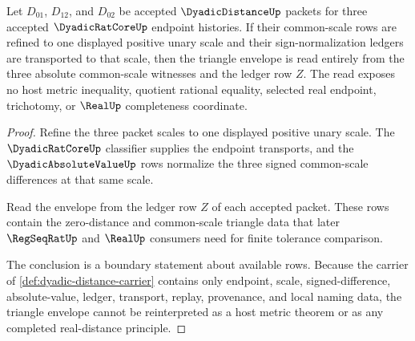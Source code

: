 \begin{theorem}
\label{thm:dyadic-distance-triangle-envelope}
Let $D_{01}$, $D_{12}$, and $D_{02}$ be accepted $\DyadicDistanceUp$ packets for three accepted $\DyadicRatCoreUp$ endpoint histories. If their common-scale rows are refined to one displayed positive unary scale and their sign-normalization ledgers are transported to that scale, then the triangle envelope is read entirely from the three absolute common-scale witnesses and the ledger row $Z$. The read exposes no host metric inequality, quotient rational equality, selected real endpoint, trichotomy, or $\RealUp$ completeness coordinate.
\end{theorem}
\begin{proof}
Refine the three packet scales to one displayed positive unary scale. The $\DyadicRatCoreUp$ classifier supplies the endpoint transports, and the $\DyadicAbsoluteValueUp$ rows normalize the three signed common-scale differences at that same scale.

Read the envelope from the ledger row $Z$ of each accepted packet. These rows contain the zero-distance and common-scale triangle data that later $\RegSeqRatUp$ and $\RealUp$ consumers need for finite tolerance comparison.

The conclusion is a boundary statement about available rows. Because the carrier of \autoref{def:dyadic-distance-carrier} contains only endpoint, scale, signed-difference, absolute-value, ledger, transport, replay, provenance, and local naming data, the triangle envelope cannot be reinterpreted as a host metric theorem or as any completed real-distance principle.
\end{proof}


\begin{closurestatus}{\DyadicDistanceUp}
  \theoryclosure{\seedClosure}
  \formalstatus{\unformalizedV}
\end{closurestatus}
